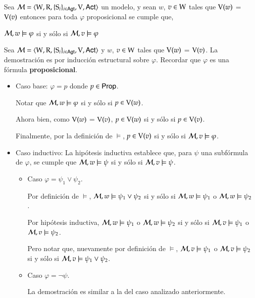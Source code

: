 

\begin{lema}
    Sea $\mathcal{M}=\langle \mathrm{W},\mathrm{R},\{ \mathrm{S}_i \}_{i \in {\rm \sf Agt}},\mathrm{V},{\rm \sf Act} \rangle$ un modelo, y sean $w$, $v \in \mathrm{W}$ tales que $\mathrm{V}(w)$ = $\mathrm{V}(v)$ entonces para toda $\varphi$ proposicional se cumple que, 
    \begin{center}
    $\mathcal{M}, w \models \varphi$ \quad si y sólo si \quad $ 
    \mathcal{M}, v \models \varphi$
    \end{center}
\end{lema}

\begin{demostracion}
    Sea $\mathcal{M}=\langle \mathrm{W},\mathrm{R},\{ \mathrm{S}_i \}_{i \in {\rm \sf Agt}},\mathrm{V},{\rm \sf Act} \rangle$ y $w$, $v \in \mathrm{W}$ tales que $\mathrm{V}(w)$ = $\mathrm{V}(v)$. La demostración es por inducción estructural sobre $\varphi$. Recordar que $\varphi$ es una fórmula \textbf{proposicional}.

    \begin{itemize}
        \item Caso base: $\varphi = p$ donde $p \in {\rm \sf Prop}$.

        Notar que  $\mathcal{M}, w \models \varphi$ si y sólo si $p \in \mathrm{V}(w)$.

        Ahora bien, como $\mathrm{V}(w)$ = $\mathrm{V}(v)$, $p \in \mathrm{V}(w)$ si y sólo si $p \in \mathrm{V}(v)$.

        Finalmente, por la definición de $\models$, $p \in \mathrm{V}(v)$ si y sólo si $\mathcal{M}, v \models \varphi$.  
    
        \item Caso inductivo: La hipótesis inductiva establece que, para $\psi$ una subfórmula de $\varphi$, se cumple que $\mathcal{M}, w \models \psi$ si y sólo si $\mathcal{M}, v \models \psi$.

        \begin{itemize}
            \item Caso $\varphi = \psi_1 \lor \psi_2$. 
    
            Por definición de $\models$, $\mathcal{M}, w \models \psi_1 \lor \psi_2$ si y sólo si $\mathcal{M}, w \models \psi_1$ o $\mathcal{M}, w \models \psi_2$.
            
            Por hipótesis inductiva, $\mathcal{M}, w \models \psi_1$ o $\mathcal{M}, w \models \psi_2 $ si y sólo si $\mathcal{M}, v \models \psi_1$ o $\mathcal{M}, v \models \psi_2$. 
            
            Pero notar que, nuevamente por definición de $\models$, $\mathcal{M}, v \models \psi_1$ o $\mathcal{M}, v \models \psi_2$ si y sólo si $\mathcal{M},v \models \psi_1 \lor \psi_2$.  

            \item Caso $\varphi = \neg \psi$.
        
            La demostración es similar a la del caso analizado anteriormente.
        \end{itemize}
    
    \end{itemize}
    
\end{demostracion}


